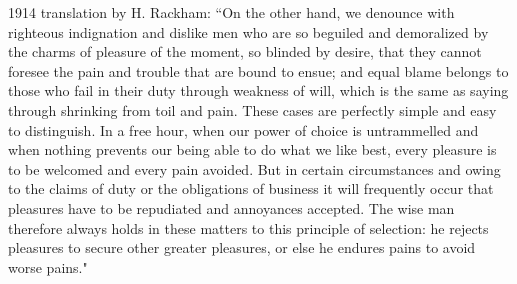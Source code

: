 1914 translation by H. Rackham: ``On the other hand, we denounce with righteous indignation and dislike men who are so beguiled and demoralized by the charms of pleasure of the moment, so blinded by desire, that they cannot foresee the pain and trouble that are bound to ensue; and equal blame belongs to those who fail in their duty through weakness of will, which is the same as saying through shrinking from toil and pain. These cases are perfectly simple and easy to distinguish. In a free hour, when our power of choice is untrammelled and when nothing prevents our being able to do what we like best, every pleasure is to be welcomed and every pain avoided. But in certain circumstances and owing to the claims of duty or the obligations of business it will frequently occur that pleasures have to be repudiated and annoyances accepted. The wise man therefore always holds in these matters to this principle of selection: he rejects pleasures to secure other greater pleasures, or else he endures pains to avoid worse pains."

